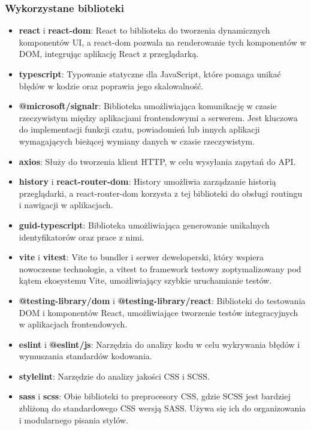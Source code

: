 \documentclass[twoside]{projektInzynierskiMS1}
\begin{document}
\newpage

\subsubsection{Wykorzystane biblioteki}

\begin{itemize} 
    \item \textbf{react} i \textbf{react-dom}: React to biblioteka do tworzenia dynamicznych komponentów UI, a react-dom pozwala na renderowanie tych komponentów w DOM, integrując aplikację React z przeglądarką. 
    \item \textbf{typescript}: Typowanie statyczne dla JavaScript, które pomaga unikać błędów w kodzie oraz poprawia jego skalowalność.
    \item \textbf{@microsoft/signalr}: Biblioteka umożliwiająca komunikację w czasie rzeczywistym między aplikacjami frontendowymi a serwerem. Jest kluczowa do implementacji funkcji czatu, powiadomień lub innych aplikacji wymagających bieżącej wymiany danych w czasie rzeczywistym.
    \item \textbf{axios}: Służy do tworzenia klient HTTP, w celu wysyłania zapytań do API. 
    \item \textbf{history} i \textbf{react-router-dom}: History umożliwia zarządzanie historią przeglądarki, a react-router-dom korzysta z tej biblioteki do obsługi routingu i nawigacji w aplikacjach. 
    \item \textbf{guid-typescript}: Biblioteka umożliwiająca generowanie unikalnych identyfikatorów oraz prace z nimi.
    \item \textbf{vite} i \textbf{vitest}: Vite to bundler i serwer deweloperski, który wspiera nowoczesne technologie, a vitest to framework testowy zoptymalizowany pod kątem ekosystemu Vite, umożliwiający szybkie uruchamianie testów. 
    \item \textbf{@testing-library/dom} i \textbf{@testing-library/react}: Biblioteki do testowania DOM i komponentów React, umożliwiające tworzenie testów integracyjnych w aplikacjach frontendowych. 
    \item \textbf{eslint} i \textbf{@eslint/js}: Narzędzia do analizy kodu w celu wykrywania błędów i wymuszania standardów kodowania.
    \item \textbf{stylelint}: Narzędzie do analizy jakości CSS i SCSS. 
    \item \textbf{sass} i \textbf{scss}: Obie biblioteki to preprocesory CSS, gdzie SCSS jest bardziej zbliżoną do standardowego CSS wersją SASS. Używa się ich do organizowania i modularnego pisania stylów. 
\end{itemize}
\end{document}

